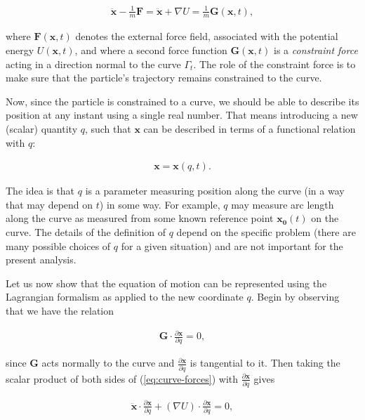 \documentclass[11pt]{report}
\theoremstyle{plain}
\theoremstyle{definition}
\begin{document}
\begin{equation*} \tag{8}\label{eq:curve-forces}
\begin{split}
\ddot{\mathbf{x}} - \frac{1}{m}\mathbf{F} = \ddot{\mathbf{x}} + \nabla U = \frac{1}{m} \mathbf{G}(\mathbf{x},t),
\end{split}
\end{equation*}

where $\mathbf{F}(\mathbf{x},t)$ denotes the external
force field, associated with the potential energy
$U(\mathbf{x},t)$, and where a second force function
$\mathbf{G}(\mathbf{x},t)$ is a \emph{constraint force}
acting in a direction normal to the curve $\Gamma_t$.
The role of the constraint force is to make sure that
the particle's trajectory remains constrained to the
curve.

Now, since the particle is constrained to a curve, we
should be able to describe its position at any instant
using a single real number. That means introducing a
new (scalar) quantity $q$, such that $\mathbf{x}$ can
be described in terms of a functional relation with
$q$:

\begin{align*}
\mathbf{x} = \mathbf{x}(q,t).
\end{align*}

The idea is that $q$ is a parameter measuring
position along the curve (in a way that may depend on
$t$) in some way. For example, $q$ may measure arc
length along the curve as measured from some known
reference point $\mathbf{x_0}(t)$ on the curve. The
details of the definition of $q$ depend on the
specific problem (there are many possible choices of
$q$ for a given situation) and are not important for
the present analysis.

Let us now show that the equation of motion can be
represented using the Lagrangian formalism as applied
to the new coordinate $q$. Begin by observing that we
have the relation

\begin{align*}
\mathbf{G}\cdot \frac{\partial \mathbf{x}}{\partial q} = 0,
\end{align*}

since $\mathbf{G}$ acts normally to the curve and
$\frac{\partial \mathbf{x}}{\partial q}$ is
tangential to it. Then taking the scalar product of
both sides of (\ref{eq:curve-forces}) with
$\frac{\partial \mathbf{x}}{\partial q}$ gives

\begin{align*}
\ddot{\mathbf{x}} \cdot \frac{\partial \mathbf{x}}{\partial q} + (\nabla U) \cdot \frac{\partial \mathbf{x}}{\partial q} = 0,
\end{align*}
\end{document}
